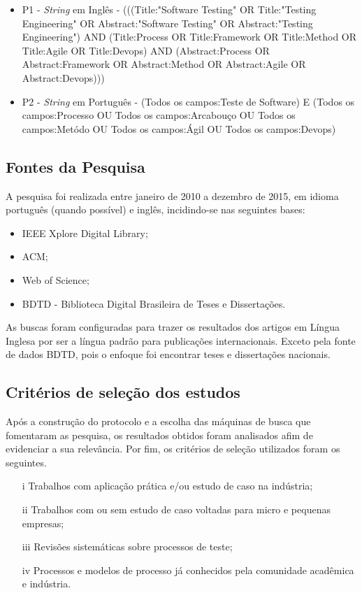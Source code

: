 \begin{itemize}
\item P1 - \textit{String} em Inglês - (((Title:"Software Testing" OR Title:"Testing Engineering" OR Abstract:"Software Testing" OR Abstract:"Testing Engineering") AND (Title:Process OR Title:Framework OR Title:Method OR Title:Agile OR Title:Devops) AND (Abstract:Process OR Abstract:Framework OR Abstract:Method OR Abstract:Agile OR Abstract:Devops)))
\item P2 - \textit{String} em Português -  (Todos os campos:Teste de Software) E (Todos os campos:Processo OU Todos os campos:Arcabouço OU Todos os campos:Metódo OU Todos os campos:Ágil OU Todos os campos:Devops)
\end{itemize}

\subsection{Fontes da Pesquisa}
\label{sec:fontesdapesquisa}

A pesquisa foi realizada entre janeiro de 2010 a dezembro de 2015, em idioma português (quando possível) e inglês, incidindo-se nas seguintes bases:

\begin{itemize}
\item IEEE Xplore Digital Library;
\item ACM;
\item Web of Science;
\item BDTD - Biblioteca Digital Brasileira de Teses e Dissertações.
\end{itemize}

As buscas foram configuradas para trazer os resultados dos artigos em Língua Inglesa por ser a língua padrão para publicações internacionais. Exceto pela fonte de dados BDTD, pois o enfoque foi encontrar teses e dissertações nacionais.

\subsection{Critérios de seleção dos estudos}
\label{sec:criteriosdeselecao}

Após a construção do protocolo e a escolha das máquinas de busca que fomentaram as pesquisa, os resultados obtidos foram analisados afim de evidenciar a sua relevância. Por fim, os critérios de seleção utilizados foram os seguintes.

\begin{enumerate}
\item [i] Trabalhos com aplicação prática e/ou estudo de caso na indústria;
\item [ii] Trabalhos com ou sem estudo de caso voltadas para micro e pequenas empresas;
\item [iii] Revisões sistemáticas sobre processos de teste;
\item [iv] Processos e modelos de processo já conhecidos pela comunidade acadêmica e indústria.
\end{enumerate} 

